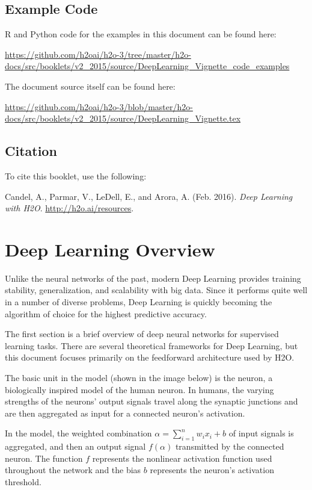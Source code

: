




\subsection{Example Code}

R and Python code for the examples in this document can be found here:

\url{https://github.com/h2oai/h2o-3/tree/master/h2o-docs/src/booklets/v2_2015/source/DeepLearning_Vignette_code_examples}

The document source itself can be found here:

\url{https://github.com/h2oai/h2o-3/blob/master/h2o-docs/src/booklets/v2_2015/source/DeepLearning_Vignette.tex}
\newpage
\subsection{Citation}

To cite this booklet, use the following: 

Candel, A., Parmar, V., LeDell, E.,  and Arora, A. (Feb. 2016). {\textit{Deep Learning with H2O}}. {\url{http://h2o.ai/resources}}. 

\section{Deep Learning Overview}
Unlike the neural networks of the past, modern Deep Learning  provides training stability, generalization, and scalability with big data. Since it performs quite well in a number of diverse problems, Deep Learning is quickly becoming the algorithm of choice for the highest predictive accuracy. 

The first section is a brief overview of deep neural networks for supervised learning tasks. There are several theoretical frameworks for Deep Learning, but this document focuses primarily on the feedforward architecture used by H2O. 

The basic unit in the model (shown in the image below) is the neuron, a biologically inspired model of the human neuron. In humans, the varying strengths of the neurons' output signals travel along the synaptic junctions and are then aggregated  as input for a connected neuron's activation. 

In the model, the weighted combination $\alpha = \sum_{i=1}^{n} w_i x_i + b$ of input signals is aggregated, and then an output signal $f(\alpha)$ transmitted by the connected neuron. The function $f$ represents the nonlinear activation function used throughout the network and the bias $b$ represents the neuron's activation threshold.

